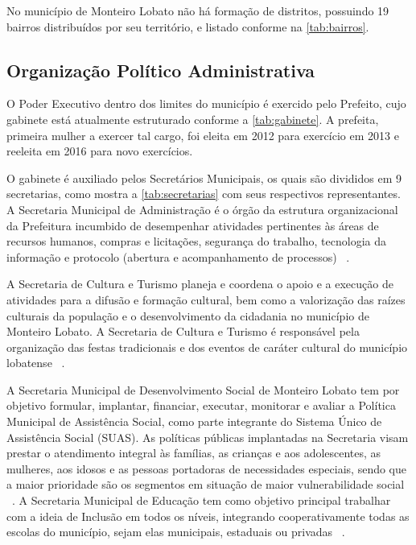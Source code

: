 No município de Monteiro Lobato não há formação de distritos, possuindo 19 bairros distribuídos por seu território, e listado conforme na \autoref{tab:bairros}.

	

\subsection{Organização Político Administrativa}
O Poder Executivo dentro dos limites do município é exercido pelo Prefeito, cujo gabinete está atualmente estruturado conforme a \autoref{tab:gabinete}. A prefeita, primeira mulher a exercer tal cargo, foi eleita em 2012 para exercício em 2013 e reeleita em 2016 para novo exercícios.

	

O gabinete é auxiliado pelos Secretários Municipais, os quais são divididos em 9 secretarias, como mostra a \autoref{tab:secretarias} com seus respectivos representantes. A Secretaria Municipal de Administração é o órgão da estrutura organizacional da Prefeitura incumbido de desempenhar atividades pertinentes às áreas de recursos humanos, compras e licitações, segurança do trabalho, tecnologia da informação e protocolo (abertura e acompanhamento de processos) ~\cite{MonteiroLobatoSite}.

A Secretaria de Cultura e Turismo planeja e coordena o apoio e a execução de atividades para a difusão e formação cultural, bem como a valorização das raízes culturais da população e o desenvolvimento da cidadania no município de Monteiro Lobato. A Secretaria de Cultura e Turismo é responsável pela organização das festas tradicionais e dos eventos de caráter cultural do município lobatense ~\cite{MonteiroLobatoSite}.

A Secretaria Municipal de Desenvolvimento Social de Monteiro Lobato tem por objetivo formular, implantar, financiar, executar, monitorar e avaliar a Política Municipal de Assistência Social, como parte integrante do Sistema Único de Assistência Social (SUAS). As políticas públicas implantadas na Secretaria visam prestar o atendimento integral às famílias, as crianças e aos adolescentes, as mulheres, aos idosos e as pessoas portadoras de necessidades especiais, sendo que a maior prioridade são os segmentos em situação de maior vulnerabilidade social ~\cite{MonteiroLobatoSite}.
A Secretaria Municipal de Educação tem como objetivo principal trabalhar com a ideia de Inclusão em todos os níveis, integrando cooperativamente todas as escolas do município, sejam elas municipais, estaduais ou privadas ~\cite{MonteiroLobatoSite}.

